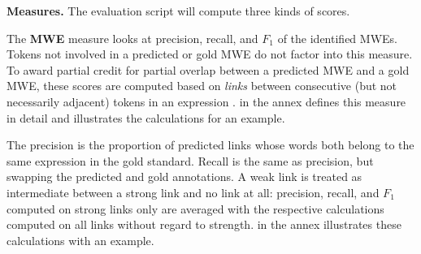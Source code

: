 \documentclass[11pt]{article}
\newcommand{\ensuretext}[1]{#1}
\newcommand{\nssmarker}{\ensuretext{\textcolor{magenta}{\ensuremath{^{\textsc{NS}}_{\textsc{S}}}}}}
\newcommand{\dhmarker}{\ensuretext{\textcolor{red}{\ensuremath{^{\textsc{D}}_{\textsc{H}}}}}}
\newcommand{\arkcomment}[3]{\ensuretext{\textcolor{#3}{[#1 #2]}}}
\newcommand{\nss}[1]{\arkcomment{\nssmarker}{#1}{magenta}}
\newcommand{\dirk}[1]{\arkcomment{\dhmarker}{#1}{red}}
\newcommand{\longversion}[1]{} %
\begin{document}

\textbf{Measures.}
The evaluation script will compute three kinds of scores.

The \textbf{MWE} measure looks at precision, recall, and $F_1$ 
of the identified MWEs. Tokens not involved in a predicted or gold MWE
do not factor into this measure. 
To award partial credit for partial overlap between a predicted MWE 
and a gold MWE, these scores are computed based on \emph{links} between 
consecutive (but not necessarily adjacent) tokens in an expression \citep{schneider-14}.
 in the annex defines this measure in detail and illustrates the calculations for an example.

 The precision is the proportion of predicted links whose words 
 both belong to the same expression in the gold standard. 
 Recall is the same as precision, but swapping the predicted and gold annotations.\longversion{\footnote{This computation on the basis of links 
 is a slight simplification of the MUC coreference measure \citep{vilain-95}.}}
 A weak link is treated as intermediate between a strong link and no link at all: 
 precision, recall, and $F_1$ computed on strong links only are averaged 
 with the respective calculations computed on all links without regard to strength. 
  in the annex illustrates these calculations with an example.
\end{document}
